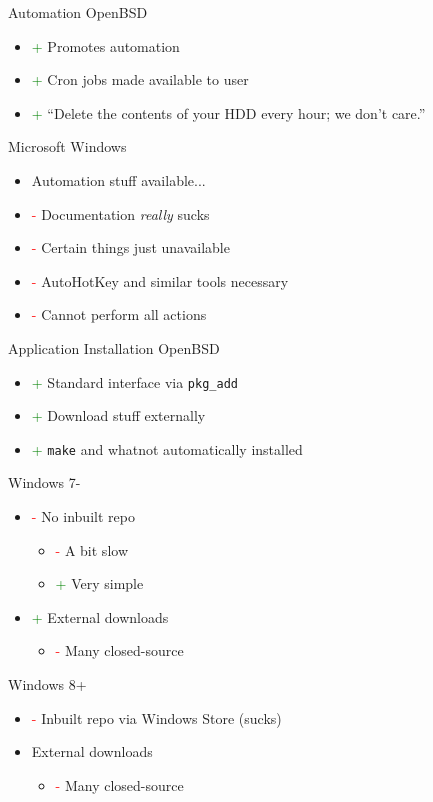 \documentclass{beamer}
\newcommand{\good}{\textcolor{green}{+ }}
\newcommand{\bad}{\textcolor{red}{- }}
\begin{document}
			\begin{frame}{Automation}
				OpenBSD
				\begin{itemize}
					\item \good Promotes automation
					\item \good Cron jobs made available to user
					\item \good ``Delete the contents of your HDD every hour; we don't care.''
				\end{itemize}
				Microsoft Windows
				\begin{itemize}
					\item Automation stuff available...
					\item \bad Documentation \textit{really} sucks
					\item \bad Certain things just unavailable
					\item \bad AutoHotKey and similar tools necessary
					\item \bad Cannot perform all actions
				\end{itemize}
			\end{frame}
			\begin{frame}{Application Installation}
				OpenBSD
				\begin{itemize}
					\item \good Standard interface via \texttt{pkg\_add}
					\item \good Download stuff externally
					\item \good \texttt{make} and whatnot automatically installed
				\end{itemize}
				Windows 7-
				\begin{itemize}
					\item \bad No inbuilt repo
					\begin{itemize}
						\item \bad A bit slow
						\item \good Very simple
					\end{itemize}
					\item \good External downloads
					\begin{itemize}
						\item \bad Many closed-source
					\end{itemize}
				\end{itemize}
				Windows 8+
				\begin{itemize}
					\item \bad Inbuilt repo via Windows Store (sucks)
					\item External downloads
					\begin{itemize}
						\item \bad Many closed-source
					\end{itemize}
				\end{itemize}
			\end{frame}
\end{document}
